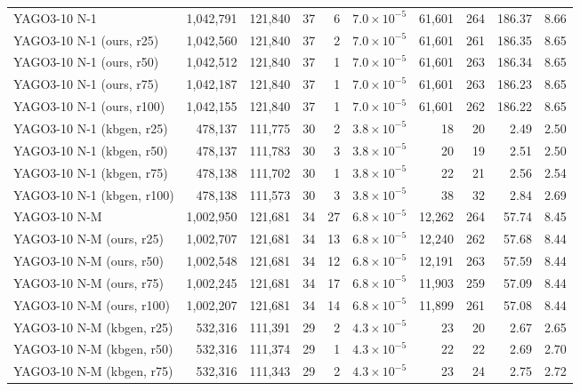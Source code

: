 \begin{tabular}{lrrrrrrrrr}
\midrule
YAGO3-10 N-1 & 1{,}042{,}791 & 121{,}840 & 37 & 6 & $7.0\times10^{-5}$ & 61{,}601 & 264 & 186.37 & 8.66 \\
YAGO3-10 N-1 (ours, r25) & 1{,}042{,}560 & 121{,}840 & 37 & 2 & $7.0\times10^{-5}$ & 61{,}601 & 261 & 186.35 & 8.65 \\
YAGO3-10 N-1 (ours, r50) & 1{,}042{,}512 & 121{,}840 & 37 & 1 & $7.0\times10^{-5}$ & 61{,}601 & 263 & 186.34 & 8.65 \\
YAGO3-10 N-1 (ours, r75) & 1{,}042{,}187 & 121{,}840 & 37 & 1 & $7.0\times10^{-5}$ & 61{,}601 & 263 & 186.23 & 8.65 \\
YAGO3-10 N-1 (ours, r100) & 1{,}042{,}155 & 121{,}840 & 37 & 1 & $7.0\times10^{-5}$ & 61{,}601 & 262 & 186.22 & 8.65 \\
YAGO3-10 N-1 (kbgen, r25) & 478{,}137 & 111{,}775 & 30 & 2 & $3.8\times10^{-5}$ & 18 & 20 & 2.49 & 2.50 \\
YAGO3-10 N-1 (kbgen, r50) & 478{,}137 & 111{,}783 & 30 & 3 & $3.8\times10^{-5}$ & 20 & 19 & 2.51 & 2.50 \\
YAGO3-10 N-1 (kbgen, r75) & 478{,}138 & 111{,}702 & 30 & 1 & $3.8\times10^{-5}$ & 22 & 21 & 2.56 & 2.54 \\
YAGO3-10 N-1 (kbgen, r100) & 478{,}138 & 111{,}573 & 30 & 3 & $3.8\times10^{-5}$ & 38 & 32 & 2.84 & 2.69 \\
\midrule
YAGO3-10 N-M & 1{,}002{,}950 & 121{,}681 & 34 & 27 & $6.8\times10^{-5}$ & 12{,}262 & 264 & 57.74 & 8.45 \\
YAGO3-10 N-M (ours, r25) & 1{,}002{,}707 & 121{,}681 & 34 & 13 & $6.8\times10^{-5}$ & 12{,}240 & 262 & 57.68 & 8.44 \\
YAGO3-10 N-M (ours, r50) & 1{,}002{,}548 & 121{,}681 & 34 & 12 & $6.8\times10^{-5}$ & 12{,}191 & 263 & 57.59 & 8.44 \\
YAGO3-10 N-M (ours, r75) & 1{,}002{,}245 & 121{,}681 & 34 & 17 & $6.8\times10^{-5}$ & 11{,}903 & 259 & 57.09 & 8.44 \\
YAGO3-10 N-M (ours, r100) & 1{,}002{,}207 & 121{,}681 & 34 & 14 & $6.8\times10^{-5}$ & 11{,}899 & 261 & 57.08 & 8.44 \\
YAGO3-10 N-M (kbgen, r25) & 532{,}316 & 111{,}391 & 29 & 2 & $4.3\times10^{-5}$ & 23 & 20 & 2.67 & 2.65 \\
YAGO3-10 N-M (kbgen, r50) & 532{,}316 & 111{,}374 & 29 & 1 & $4.3\times10^{-5}$ & 22 & 22 & 2.69 & 2.70 \\
YAGO3-10 N-M (kbgen, r75) & 532{,}316 & 111{,}343 & 29 & 2 & $4.3\times10^{-5}$ & 23 & 24 & 2.75 & 2.72 \\

\end{tabular}
